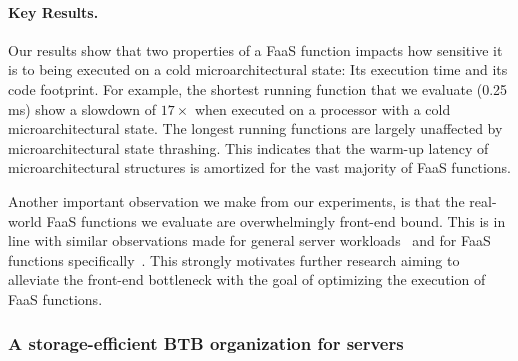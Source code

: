 \documentclass[../main.tex]{subfiles}
\begin{document}
\begin{refsection}
\paragraph{Key Results.}
Our results show that two properties of a FaaS function impacts how
sensitive it is to being executed on a cold microarchitectural state:
Its execution time and its code footprint. For example, the shortest
running function that we evaluate (0.25 ms) show a slowdown of
$17\times$ when executed on a processor with a cold microarchitectural
state. The longest running functions are largely unaffected by
microarchitectural state thrashing. This indicates that the warm-up
latency of microarchitectural structures is amortized for the vast
majority of FaaS functions.

Another important observation we make from our experiments, is that
the real-world FaaS functions we evaluate are overwhelmingly front-end
bound. This is in line with similar observations made for general
server
workloads~\cite{ferdman12_clear_cloud,kanev15_profil,ayers19_asmdb}
and for FaaS functions specifically~\cite{lukewarm_serverless}. This
strongly motivates further research aiming to alleviate the front-end
bottleneck with the goal of optimizing the execution of FaaS
functions.

\subsubsection{A storage-efficient BTB organization for servers}
\label{subsub:btbx}


\end{refsection}
\end{document}
